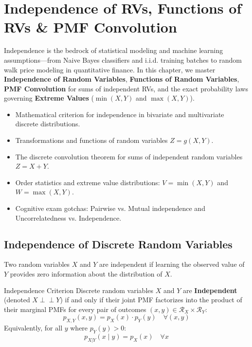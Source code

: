 \chapter{Independence of RVs, Functions of RVs \& PMF Convolution}

Independence is the bedrock of statistical modeling and machine learning assumptions---from Naive Bayes classifiers and i.i.d. training batches to random walk price modeling in quantitative finance. In this chapter, we master \textbf{Independence of Random Variables}, \textbf{Functions of Random Variables}, \textbf{PMF Convolution} for sums of independent RVs, and the exact probability laws governing \textbf{Extreme Values} ($\min(X, Y)$ and $\max(X, Y)$).

\vspace{0.5cm}
\begin{tcolorbox}[colback=primarylight, colframe=primarydark, title={\textbf{What You'll Learn in this Chapter}}]
\begin{itemize}
    \item Mathematical criterion for independence in bivariate and multivariate discrete distributions.
    \item Transformations and functions of random variables $Z = g(X, Y)$.
    \item The discrete convolution theorem for sums of independent random variables $Z = X + Y$.
    \item Order statistics and extreme value distributions: $V = \min(X, Y)$ and $W = \max(X, Y)$.
    \item Cognitive exam gotchas: Pairwise vs. Mutual independence and Uncorrelatedness vs. Independence.
\end{itemize}
\end{tcolorbox}

\section{Independence of Discrete Random Variables}

Two random variables $X$ and $Y$ are independent if learning the observed value of $Y$ provides zero information about the distribution of $X$.

\begin{definitionbox}{Independence Criterion}
Discrete random variables $X$ and $Y$ are \textbf{Independent} (denoted $X \perp\!\!\!\perp Y$) if and only if their joint PMF factorizes into the product of their marginal PMFs for every pair of outcomes $(x, y) \in \mathcal{R}_X \times \mathcal{R}_Y$:
$$p_{X,Y}(x, y) = p_X(x) \cdot p_Y(y) \quad \forall (x, y)$$
Equivalently, for all $y$ where $p_Y(y) > 0$:
$$p_{X|Y}(x \mid y) = p_X(x) \quad \forall x$$
\end{definitionbox}

